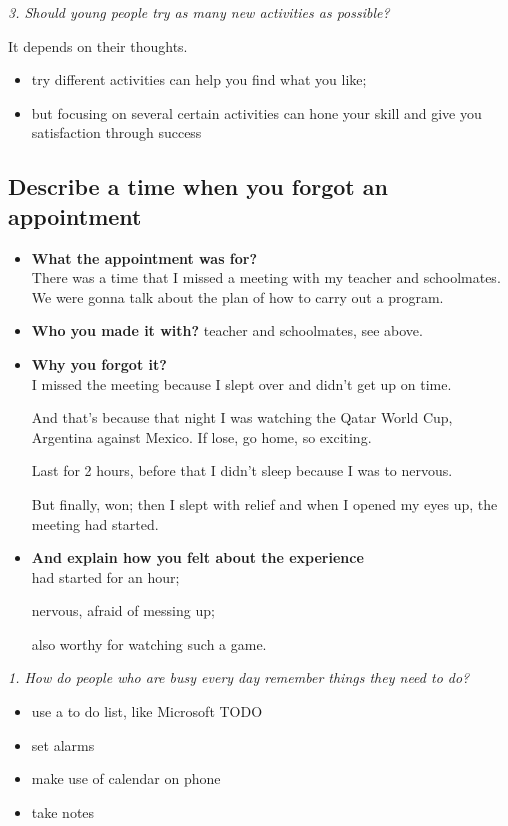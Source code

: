 \documentclass[conference]{IEEEtran}
\begin{document}
\textit{3. Should young people try as many new activities as possible?}

It depends on their thoughts.
\begin{itemize}
    \item try different activities can help you find what you like;
    \item but focusing on several certain activities can hone your skill and give you satisfaction through success
\end{itemize}

\subsection{Describe a time when you forgot an appointment}
\begin{itemize}
    \item \textbf{What the appointment was for?}\\
    There was a time that I missed a meeting with my teacher and schoolmates. 
    We were gonna talk about the plan of how to carry out a program.
    \item \textbf{Who you made it with?}
    teacher and schoolmates, see above.
    \item \textbf{Why you forgot it?}\\
    I missed the meeting because I slept over and didn't get up on time.

    And that's because that night I was watching the Qatar World Cup, Argentina against Mexico.
    If lose, go home, so exciting.

    Last for 2 hours, before that I didn't sleep because I was to nervous.

    But finally, won; then I slept with relief and when I opened my eyes up, the meeting had started.
    \item \textbf{And explain how you felt about the experience}\\
    had started for an hour;

    nervous, afraid of messing up;

    also worthy for watching such a game.
\end{itemize}

\textit{1. How do people who are busy every day remember things they need to do?}
\begin{itemize}
    \item use a to do list, like Microsoft TODO
    \item set alarms
    \item make use of calendar on phone
    \item take notes
\end{itemize}
\end{document}
